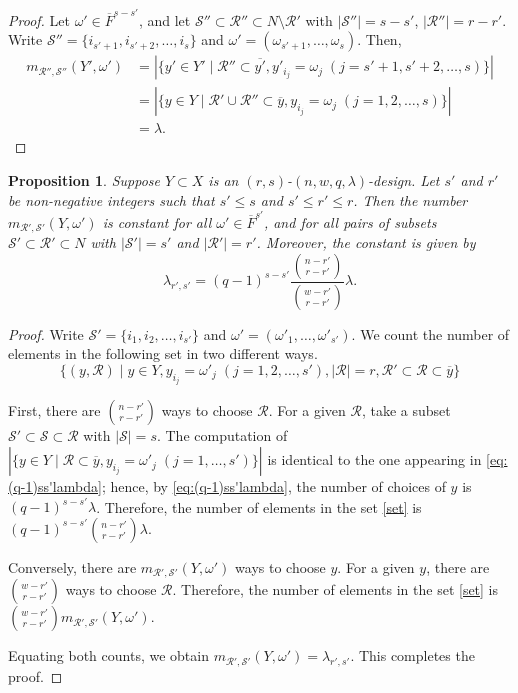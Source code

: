 \documentclass[a4paper, 11pt]{article}
\newtheorem{proposition}[theorem]{Proposition}
\theoremstyle{definition}
\begin{document}
\begin{proof}
Let $\omega' \in \overline{F}^{s-s'}$, and let $\mathcal{S}'' \subset \mathcal{R}'' \subset N \setminus \mathcal{R}'$ with $|\mathcal{S}''| = s-s'$, $|\mathcal{R}''| = r-r'$.
Write $\mathcal{S}'' = \{i_{s'+1},i_{s'+2},\ldots,i_s\}$ and $\omega' = (\omega_{s'+1},\ldots,\omega_s)$.
Then,
\begin{align*}
m_{\mathcal{R}'',\mathcal{S}''}(Y',\omega') &= |\{y' \in Y' \mid \mathcal{R}'' \subset \overline{y'}, y'_{i_j} = \omega_j \; (j = s'+1,s'+2,\ldots,s)\}| \\
&= |\{y \in Y \mid \mathcal{R}' \cup \mathcal{R}'' \subset \overline{y}, y_{i_j} = \omega_j \; (j = 1,2,\ldots,s)\}| \\
&= \lambda.
\end{align*}
\end{proof}

\begin{proposition}\label{prop:lambda_rs}
Suppose $Y \subset X$ is an $(r,s)$-$(n, w, q, \lambda)$-design.
Let $s'$ and $r'$ be non-negative integers such that $s' \le s$ and $s' \le r' \le r$.
Then the number $m_{\mathcal{R}',\mathcal{S}'}(Y,\omega')$ is constant for all $\omega' \in \overline{F}^{s'}$, and for all pairs of subsets $\mathcal{S}' \subset \mathcal{R}'\subset N$ with $|\mathcal{S}'| = s'$ and $|\mathcal{R}'| = r'$.
Moreover, the constant is given by
\[
\lambda_{r',s'} = (q-1)^{s-s'}\frac{\binom{n-r'}{r-r'}}{\binom{w-r'}{r-r'}} \lambda.
\]
\end{proposition}

\begin{proof}
Write $\mathcal{S}' = \{i_1,i_2,\ldots,i_{s'}\}$ and $\omega' = (\omega'_1,\ldots,\omega'_{s'})$.
We count the number of elements in the following set in two different ways.
\begin{equation}\label{set}
\{ (y,\mathcal{R}) \mid y \in Y, y_{i_j} = \omega'_j \; (j = 1,2,\ldots,s'), |\mathcal{R}| = r, \mathcal{R}' \subset \mathcal{R} \subset \overline{y} \}
\end{equation}

First, there are $\binom{n-r'}{r-r'}$ ways to choose $\mathcal{R}$.
For a given $\mathcal{R}$,
take a subset $\mathcal{S}' \subset \mathcal{S} \subset \mathcal{R}$
with $|\mathcal{S}| = s$.
The computation of 
$|\{ y \in Y \mid \mathcal{R} \subset \overline{y},y_{i_j} = \omega'_j \;(j=1,\ldots,s') \}|$
is identical to the one appearing in \eqref{eq:(q-1)ss'lambda}; 
hence, by \eqref{eq:(q-1)ss'lambda}, the number of choices of $y$ is $(q-1)^{s-s'} \lambda$.
Therefore, the number of elements in the set \eqref{set} is $(q-1)^{s-s'}\binom{n-r'}{r-r'} \lambda$.

Conversely, there are $m_{\mathcal{R}',\mathcal{S}'}(Y,\omega')$ ways to choose $y$.
For a given $y$, there are $\binom{w-r'}{r-r'}$ ways to choose $\mathcal{R}$.
Therefore, the number of elements in the set \eqref{set} is $\binom{w-r'}{r-r'}m_{\mathcal{R}',\mathcal{S}'}(Y,\omega')$.

Equating both counts, we obtain $m_{\mathcal{R}',\mathcal{S}'}(Y,\omega') = \lambda_{r',s'}$.
This completes the proof.
\end{proof}
\end{document}
